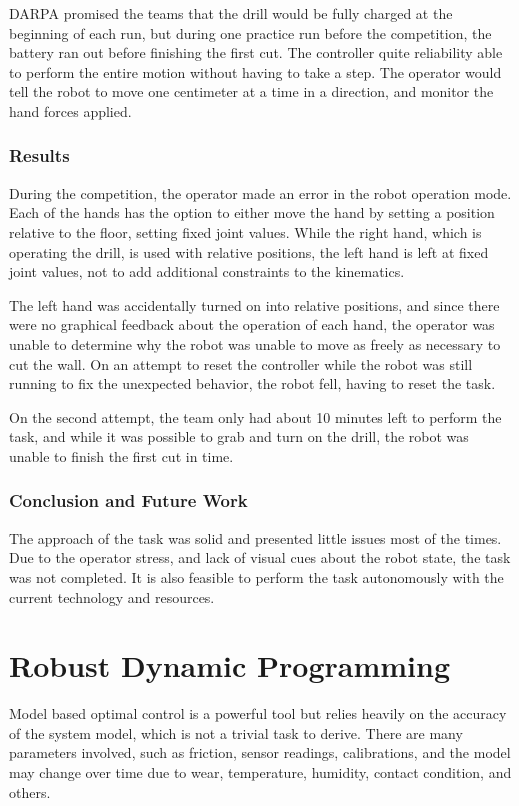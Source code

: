 \documentclass[12pt]{report}
\begin{document}
DARPA promised the teams that the drill would be fully charged at the beginning of each run, but during one practice run before the competition, the battery ran out before finishing the first cut. The controller quite reliability able to perform the entire motion without having to take a step. The operator would tell the robot to move one centimeter at a time in a direction, and monitor the hand forces applied.  

\subsection{Results}
During the competition, the operator made an error in the robot operation mode. Each of the hands has the option to either move the hand by setting a position relative to the floor, setting fixed joint values. While the right hand, which is operating the drill, is used with relative positions, the left hand is left at fixed joint values, not to add additional constraints to the kinematics. 

The left hand was accidentally turned on into relative positions, and since there were no graphical feedback about the operation of each hand, the operator was unable to determine why the robot was unable to move as freely as necessary to cut the wall. On an attempt to reset the controller while the robot was still running to fix the unexpected behavior, the robot fell, having to reset the task. 

On the second attempt, the team only had about 10 minutes left to perform the task, and while it was possible to grab and turn on the drill, the robot was unable to finish the first cut in time.

\subsection{Conclusion and Future Work}

The approach of the task was solid and presented little issues most of the times. Due to the operator stress, and lack of visual cues about the robot state, the task was not completed. It is also feasible to perform the task autonomously with the current technology and resources. 

\chapter{Robust Dynamic Programming}
Model based optimal control is a powerful tool but relies heavily on the accuracy of the system model, which is not a trivial task to derive. There are many parameters involved, such as friction, sensor readings, calibrations, and the model may change over time due to wear, temperature, humidity, contact condition, and others.
\end{document}
